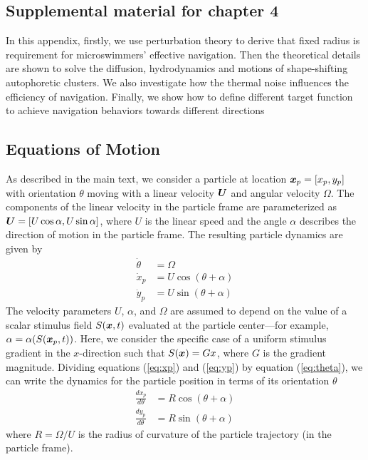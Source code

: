 \begin{appendices}



\chapter{Supplemental material for chapter 4}
In this appendix, firstly, we use perturbation theory to derive that fixed radius is requirement for microswimmers' effective navigation. Then the theoretical details are shown to solve the diffusion, hydrodynamics and motions of shape-shifting autophoretic clusters. We also investigate how the thermal noise influences the efficiency of navigation. Finally, we show how to define different target function to achieve navigation behaviors towards different directions 

\section{Equations of Motion}

As described in the main text, we consider a particle at location $\boldsymbol{x}_p=[x_p,y_p]$ with orientation $\theta$ moving with a linear velocity $\boldsymbol{U}$ and angular velocity $\Omega$.  The components of the linear velocity in the particle frame are parameterized as $\boldsymbol{U}=[U \cos\alpha, U\sin \alpha]$, where $U$ is the linear speed and the angle $\alpha$ describes the direction of motion in the particle frame.  The resulting particle dynamics are given by
\begin{align}
    \dot{\theta} &= \Omega \label{eq:theta}
    \\ 
    \dot{x}_p &= U \cos(\theta + \alpha) \label{eq:xp} 
    \\ 
    \dot{y}_p &= U \sin(\theta + \alpha)\label{eq:yp}
\end{align}	
The velocity parameters $U$, $\alpha$, and $\Omega$ are assumed to depend on the value of a scalar stimulus field $S(\boldsymbol{x},t)$ evaluated at the particle center---for example, $\alpha=\alpha(S(\boldsymbol{x}_p,t))$. Here, we consider the specific case of a uniform stimulus gradient in the $x$-direction such that $S(\boldsymbol{x})= G x$, where $G$ is the gradient magnitude. Dividing equations (\ref{eq:xp}) and (\ref{eq:yp}) by equation (\ref{eq:theta}), we can write the dynamics for the particle position in terms of its orientation $\theta$ 
\begin{align}
    \frac{d x_p}{d\theta} &= R \cos(\theta + \alpha) \label{eq:xp2} 
    \\ 
    \frac{d y_p}{d\theta} &= R \sin(\theta + \alpha)\label{eq:yp2}
\end{align}	
where $R=\Omega/U$ is the radius of curvature of the particle trajectory (in the particle frame). 


\end{appendices}
